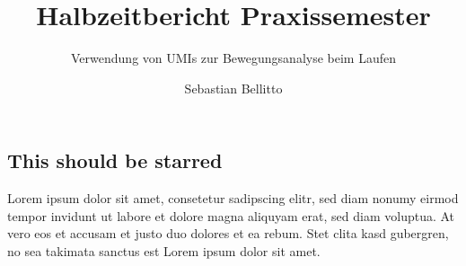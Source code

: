 \documentclass[a4paper,12pt]{report}
\author{Sebastian Bellitto}
\title{Halbzeitbericht Praxissemester}
\subtitle{Verwendung von UMIs zur Bewegungsanalyse beim Laufen}
\begin{document}
\setlength{\parindent}{0pt}
\setlength{\parskip}{1.2ex plus 0.5ex minus 0.2ex}

\hstitlepage

\begin{frontmatter}
\chapter*{This should be starred}
Lorem ipsum dolor sit amet, consetetur sadipscing elitr, sed diam nonumy eirmod tempor invidunt ut labore et dolore magna aliquyam erat, sed diam voluptua. At vero eos et accusam et justo duo dolores et ea rebum. Stet clita kasd gubergren, no sea takimata sanctus est Lorem ipsum dolor sit amet.


\tableofcontents
\end{frontmatter}


\cleardoublepage
{}
{}
\listoftables

\cleardoublepage
{}
{}
\listoffigures

\printbibliography[heading=bibintoc, title={Literatur}]

\cleardoublepage
{}
{}
\printindex
\end{document}
